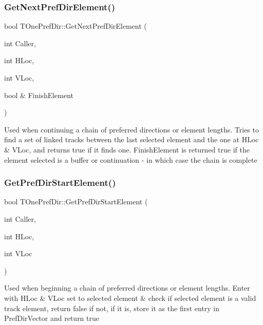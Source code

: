 \subsubsection{\texorpdfstring{Get\+Next\+Pref\+Dir\+Element()}{GetNextPrefDirElement()}}
{\footnotesize\ttfamily bool T\+One\+Pref\+Dir\+::\+Get\+Next\+Pref\+Dir\+Element (\begin{DoxyParamCaption}\item[{int}]{Caller,  }\item[{int}]{H\+Loc,  }\item[{int}]{V\+Loc,  }\item[{bool \&}]{Finish\+Element }\end{DoxyParamCaption})}

Used when continuing a chain of preferred directions or element lengths. Tries to find a set of linked tracks between the last selected element and the one at H\+Loc \& V\+Loc, and returns true if it finds one. Finish\+Element is returned true if the element selected is a buffer or continuation -\/ in which case the chain is complete \mbox{\label{class_t_one_pref_dir_ace0402792492c9da2551423f8287e41e}} 
\subsubsection{\texorpdfstring{Get\+Pref\+Dir\+Start\+Element()}{GetPrefDirStartElement()}}
{\footnotesize\ttfamily bool T\+One\+Pref\+Dir\+::\+Get\+Pref\+Dir\+Start\+Element (\begin{DoxyParamCaption}\item[{int}]{Caller,  }\item[{int}]{H\+Loc,  }\item[{int}]{V\+Loc }\end{DoxyParamCaption})}

Used when beginning a chain of preferred directions or element lengths. Enter with H\+Loc \& V\+Loc set to selected element \& check if selected element is a valid track element, return false if not, if it is, store it as the first entry in Pref\+Dir\+Vector and return true \mbox{\label{class_t_one_pref_dir_a8fd55282096fe63f0baeab323c6ccc8b}} 
